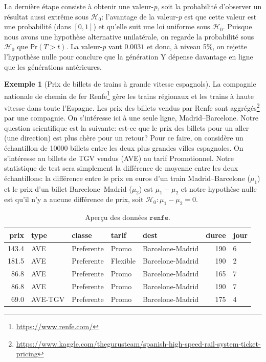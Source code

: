 \documentclass[
  11pt,
  letterpaper,
]{article}
\renewcommand{\href}[2]{#2\footnote{\url{#1}}}
\theoremstyle{definition}
\theoremstyle{definition}
\newtheorem{example}{Exemple}[section]
\theoremstyle{definition}
\theoremstyle{definition}
\theoremstyle{remark}
\begin{document}
La dernière étape consiste à obtenir une valeur-\emph{p}, soit la probabilité d'observer un résultat aussi extrême sous \(\mathscr{H}_0\): l'avantage de la valeur-\emph{p} est que cette valeur est une probabilité (dans \([0, 1]\)) et qu'elle suit une loi uniforme sous \(\mathscr{H}_0\). Puisque nous avons une hypothèse alternative unilatérale, on regarde la probabilité sous \(\mathscr{H}_0\) que \(\mathsf{Pr}(T > t)\). La valeur-\emph{p} vaut \(0.0031\) et donc, à niveau 5\%, on rejette l'hypothèse nulle pour conclure que la génération Y dépense davantage en ligne que les générations antérieures.

\begin{example}[Prix de billets de trains à grande vitesse espagnols]
\protect\hypertarget{exm:prix-trains-tests}{}\label{exm:prix-trains-tests}La compagnie nationale de chemin de fer \href{https://www.renfe.com/}{Renfe} gère les trains régionaux et les trains à haute vitesse dans toute l'Espagne. Les prix des billets vendus par Renfe sont \href{https://www.kaggle.com/thegurusteam/spanish-high-speed-rail-system-ticket-pricing}{aggrégés} par une compagnie. On s'intéresse ici à une seule ligne, Madrid--Barcelone. Notre question scientifique est la suivante: est-ce que le prix des billets pour un aller (une direction) est plus chère pour un retour? Pour ce faire, on considère un échantillon de 10000 billets entre les deux plus grandes villes espagnoles. On s'intéresse au billets de TGV vendus (AVE) au tarif Promotionnel. Notre statistique de test sera simplement la différence de moyenne entre les deux échantillons: la différence entre le prix en euros d'un train Madrid--Barcelone (\(\mu_1\)) et le prix d'un billet Barcelone--Madrid (\(\mu_2\)) est \(\mu_1-\mu_2\) et notre hypothèse nulle est qu'il n'y a aucune différence de prix, soit \(\mathscr{H}_0: \mu_1-\mu_2=0\).
\end{example}

\begin{table}

\caption{\label{tab:renfetest}Aperçu des données $\texttt{renfe}$.}
\centering
\begin{tabular}[t]{rllllrl}
\toprule
prix & type & classe & tarif & dest & duree & jour\\
\midrule
143.4 & AVE & Preferente & Promo & Barcelone-Madrid & 190 & 6\\
181.5 & AVE & Preferente & Flexible & Barcelone-Madrid & 190 & 2\\
86.8 & AVE & Preferente & Promo & Barcelone-Madrid & 165 & 7\\
86.8 & AVE & Preferente & Promo & Barcelone-Madrid & 190 & 7\\
69.0 & AVE-TGV & Preferente & Promo & Barcelone-Madrid & 175 & 4\\
\bottomrule
\end{tabular}
\end{table}
\end{document}
